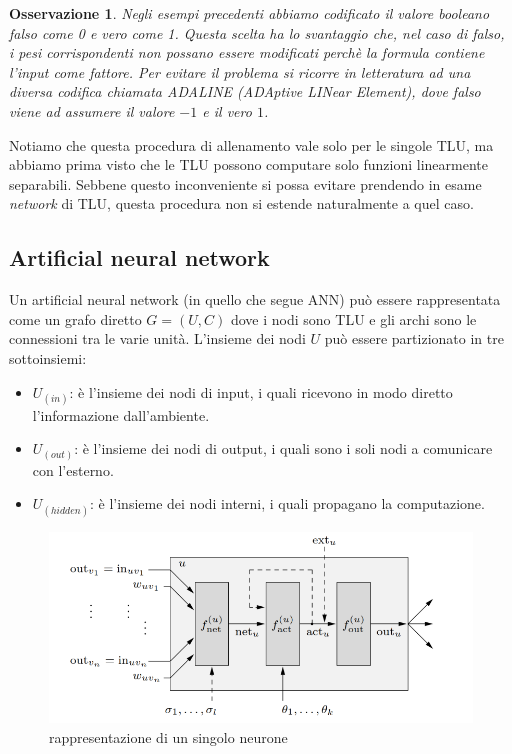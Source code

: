 \documentclass[10pt,a4paper]{article}
\newtheorem{remark}{Osservazione}
\begin{document}
\begin{remark}
Negli esempi precedenti abbiamo codificato il valore booleano \emph{falso} come 0 e \emph{vero} come 1. Questa scelta ha lo svantaggio che, nel caso di \emph{falso}, i pesi corrispondenti non possano essere modificati perchè la formula contiene l'input come fattore. Per evitare il problema si ricorre in letteratura ad una diversa codifica chiamata \emph{ADALINE} (ADAptive LINear Element), dove \emph{falso} viene ad assumere il valore $-1$ e il \emph{vero} $1$.
\end{remark}

Notiamo che questa procedura di allenamento vale solo per le singole TLU, ma abbiamo prima visto che le TLU possono computare solo funzioni linearmente separabili. Sebbene questo inconveniente si possa evitare prendendo in esame \emph{network} di TLU, questa procedura non si estende naturalmente a quel caso.

\subsection{Artificial neural network}

Un artificial neural network (in quello che segue ANN) può essere rappresentata come un grafo diretto $G = (U,C)$ dove i nodi sono TLU e gli archi sono le connessioni tra le varie unità. L'insieme dei nodi $U$ può essere partizionato in tre sottoinsiemi:

\begin{itemize}
\item{$U_{(in)}$: è l'insieme dei nodi di input, i quali ricevono in modo diretto l'informazione dall'ambiente.}
\item{$U_{(out)}$: è l'insieme dei nodi di output, i quali sono i soli nodi a comunicare con l'esterno.}
\item{$U_{(hidden)}$: è l'insieme dei nodi interni, i quali propagano la computazione.}
\end{itemize}

\begin{figure}
\centering
\includegraphics[scale=0.4]{img/ANN.png}
\caption{rappresentazione di un singolo neurone}
\label{fig:7}
\end{figure}
\end{document}
